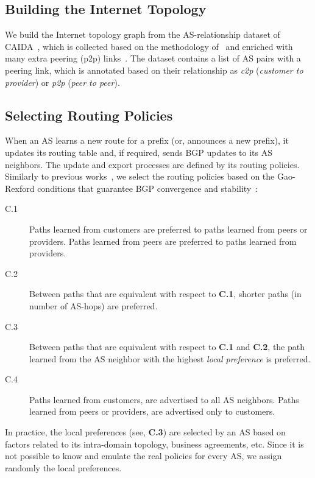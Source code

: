 \subsection{Building the Internet Topology}
We build the Internet topology graph from the AS-relationship dataset of CAIDA~\cite{AS-relationships-dataset}, which is collected based on the methodology of~\cite{AS-relationships-IMC-2013} and enriched with many extra peering (p2p) links~\cite{multilateral-peering-conext-2013}. The dataset contains a list of AS pairs with a peering link, which is annotated based on their relationship as \textit{c2p} (\textit{customer to provider}) or \textit{p2p} (\textit{peer to peer}). 


\subsection{Selecting Routing Policies}
When an AS learns a new route for a prefix (or, announces a new prefix), it updates its routing table and, if required, sends BGP updates to its AS neighbors. The update and export processes are defined by its routing policies. Similarly to previous works~\cite{Let-the-market-BGP-sigcomm-2011,how-secure-goldberg-ComNet-2014,Jumpstarting-BGP-sigcomm-2016,RPKI-deployment-2016}, we select the routing policies based on the Gao-Rexford conditions that guarantee BGP convergence and stability~\cite{stable-internet-routing-TON-2001}:
\begin{description}
\item[C.1] Paths learned from customers are preferred to paths learned from peers or providers. Paths learned from peers are preferred to paths learned from providers.
\item[C.2] Between paths that are equivalent with respect to \textbf{C.1}, shorter paths (in number of AS-hops) are preferred.
\item[C.3] Between paths that are equivalent with respect to \textbf{C.1} and \textbf{C.2}, the path learned from the AS neighbor with the highest \textit{local preference} is preferred.
\item[C.4] Paths learned from customers, are advertised to all AS neighbors. Paths learned from peers or providers, are advertised only to customers.
\end{description}

In practice, the local preferences (see, \textbf{C.3}) are selected by an AS based on factors related to its intra-domain topology, business agreements, etc. Since it is not possible to know and emulate the real policies for every AS, we assign randomly the local preferences. 






